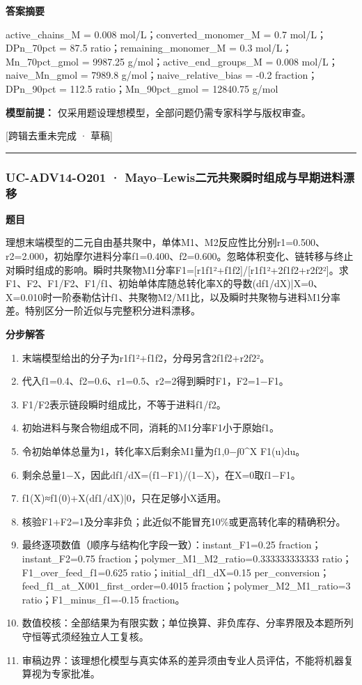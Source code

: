 \documentclass[UTF8,11pt,a4paper]{ctexart}
\begin{document}
\noindent\textbf{答案摘要}\par
active\_chains\_M = 0.008 mol/L；converted\_monomer\_M = 0.7 mol/L；DPn\_70pct = 87.5 ratio；remaining\_monomer\_M = 0.3 mol/L；Mn\_70pct\_gmol = 9987.25 g/mol；active\_end\_groups\_M = 0.008 mol/L；naive\_Mn\_gmol = 7989.8 g/mol；naive\_relative\_bias = -0.2 fraction；DPn\_90pct = 112.5 ratio；Mn\_90pct\_gmol = 12840.75 g/mol\par
\noindent\textbf{模型前提：}
仅采用题设理想模型，全部问题仍需专家科学与版权审查。\par
\noindent\textcolor{red!65!black}{[跨辑去重未完成 · 草稿]} \par
\medskip\hrule\medskip
{}
\subsubsection*{UC-ADV14-O201 · Mayo–Lewis二元共聚瞬时组成与早期进料漂移}
\noindent\textbf{题目}\par
理想末端模型的二元自由基共聚中，单体M1、M2反应性比分别r1=0.500、r2=2.000，初始摩尔进料分率f1=0.400、f2=0.600。忽略体积变化、链转移与终止对瞬时组成的影响。瞬时共聚物M1分率F1=[r1f1²+f1f2]/[r1f1²+2f1f2+r2f2²]。求F1、F2、F1/F2、F1/f1、初始单体库随总转化率X的导数(df1/dX)|X=0、X=0.010时一阶泰勒估计f1、共聚物M2/M1比，以及瞬时共聚物与进料M1分率差。特别区分一阶近似与完整积分进料漂移。\par
\medskip\noindent\textbf{分步解答}
\begin{enumerate}
\item 末端模型给出的分子为r1f1²+f1f2，分母另含2f1f2+r2f2²。
\item 代入f1=0.4、f2=0.6、r1=0.5、r2=2得到瞬时F1，F2=1−F1。
\item F1/F2表示链段瞬时组成比，不等于进料f1/f2。
\item 初始进料与聚合物组成不同，消耗的M1分率F1小于原始f1。
\item 令初始单体总量为1，转化率X后剩余M1量为f1,0−∫0\textasciicircum{}X F1(u)du。
\item 剩余总量1−X，因此df1/dX=(f1−F1)/(1−X)，在X=0取f1−F1。
\item f1(X)≈f1(0)+X(df1/dX)|0，只在足够小X适用。
\item 核验F1+F2=1及分率非负；此近似不能冒充10\%或更高转化率的精确积分。
\item 最终逐项数值（顺序与结构化字段一致）：instant\_F1=0.25 fraction；instant\_F2=0.75 fraction；polymer\_M1\_M2\_ratio=0.333333333333 ratio；F1\_over\_feed\_f1=0.625 ratio；initial\_df1\_dX=0.15 per\_conversion；feed\_f1\_at\_X001\_first\_order=0.4015 fraction；polymer\_M2\_M1\_ratio=3 ratio；F1\_minus\_f1=-0.15 fraction。
\item 数值校核：全部结果为有限实数；单位换算、非负库存、分率界限及本题所列守恒等式须经独立人工复核。
\item 审稿边界：该理想化模型与真实体系的差异须由专业人员评估，不能将机器复算视为专家批准。
\end{enumerate}
\end{document}
